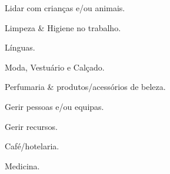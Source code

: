 

\begin{cventries}


  \cventry
    {} 
    {}
    {}
    {}
    {    	
	  \vspace{-1.0cm}
      \begin{multicols}{2}
      \begin{cvitems}
		\item {Lidar com crianças e/ou animais.} \\ 
		\item {Limpeza \& Higiene no trabalho.}  \\    
        \item {Línguas.} \\
        \item {Moda, Vestuário e Calçado.} \\   
        \item {Perfumaria \& produtos/acessórios de beleza.} \\  
        \item {Gerir pessoas e/ou equipas.} \\
        \item {Gerir recursos.} \\
        \item {Café/hotelaria.} \\                    
        \item {Medicina.} \\
      \end{cvitems}
	  \end{multicols}
	  \vspace{-0.5cm}
    }

\end{cventries}
